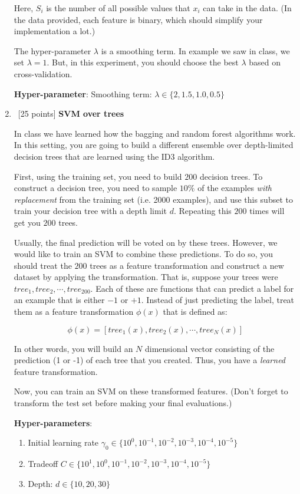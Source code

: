 \begin{enumerate}
  Here, $S_i$ is the number of all possible values that $x_i$ can take
  in the data. (In the data provided, each feature is binary, which
  should simplify your implementation a lot.)

  The hyper-parameter $\lambda$ is a smoothing term. In example we saw
  in class, we set $\lambda= 1$.  But, in this experiment, you should
  choose the best $\lambda$ based on cross-validation.

  \textbf{Hyper-parameter}: Smoothing term: $\lambda \in \{2, 1.5, 1.0, 0.5\}$

\item~[25 points] \textbf{SVM over trees}

  In class we have learned how the bagging and random forest
  algorithms work.  In this setting, you are going to build a
  different ensemble over depth-limited decision trees that are
  learned using the ID3 algorithm.

  First, using the training set, you need to build $200$ decision
  trees. To construct a decision tree, you need to sample $10\%$ of
  the examples {\em with replacement} from the training set
  (i.e. 2000 examples), and use this subset to train your decision
  tree with a depth limit $d$. Repeating this $200$ times will get
  you $200$ trees.

  Usually, the final prediction will be voted on by these
  trees. However, we would like to train an SVM to combine these
  predictions. To do so, you should treat the $200$ trees as a
  feature transformation and construct a new dataset by applying the
  transformation. That is, suppose your trees were
  $tree_1, tree_2, \cdots, tree_{200}$. Each of these are functions
  that can predict a label for an example that is either $-1$ or
  $+1$. Instead of just predicting the label, treat them as a
  feature transformation $\phi(x)$ that is defined as:

  
  $$\phi(x) = [tree_1(x), tree_2(x), \cdots, tree_{N} (x)]$$  

  In other words, you will build an $N$ dimensional vector
  consisting of the prediction (1 or -1) of each tree that you
  created. Thus, you have a {\em learned} feature transformation.

  Now, you can train an SVM on these transformed features. (Don't
  forget to transform the test set before making your final
  evaluations.)

  \textbf{Hyper-parameters}:
  \begin{enumerate}
  \item Initial learning rate $\gamma_0 \in\{10^0, 10^{-1}, 10^{-2}, 10^{-3}, 10^{-4}, 10^{-5}\}$
  \item Tradeoff $C \in \{10^1, 10^0, 10^{-1}, 10^{-2}, 10^{-3}, 10^{-4}, 10^{-5}\}$
  \item Depth: $d \in \{10, 20, 30\}$
  \end{enumerate}

\end{enumerate}


